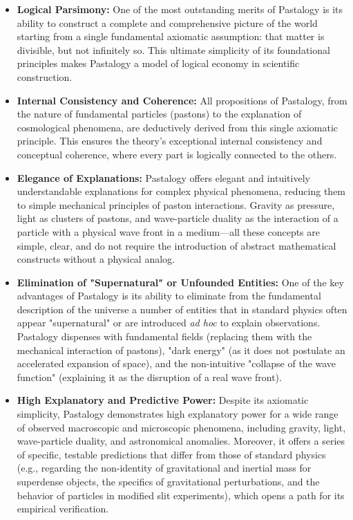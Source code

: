 \documentclass[pdflatex,sn-mathphys-num]{sn-jnl}
\begin{document}
\begin{itemize}
    \item \textbf{Logical Parsimony:} One of the most outstanding merits of Pastalogy is its ability to construct a complete and comprehensive picture of the world starting from a single fundamental axiomatic assumption: that matter is divisible, but not infinitely so. This ultimate simplicity of its foundational principles makes Pastalogy a model of logical economy in scientific construction.
    
    \item \textbf{Internal Consistency and Coherence:} All propositions of Pastalogy, from the nature of fundamental particles (pastons) to the explanation of cosmological phenomena, are deductively derived from this single axiomatic principle. This ensures the theory's exceptional internal consistency and conceptual coherence, where every part is logically connected to the others.
    
    \item \textbf{Elegance of Explanations:} Pastalogy offers elegant and intuitively understandable explanations for complex physical phenomena, reducing them to simple mechanical principles of paston interactions. Gravity as pressure, light as clusters of pastons, and wave-particle duality as the interaction of a particle with a physical wave front in a medium---all these concepts are simple, clear, and do not require the introduction of abstract mathematical constructs without a physical analog.
    
    \item \textbf{Elimination of "Supernatural" or Unfounded Entities:} One of the key advantages of Pastalogy is its ability to eliminate from the fundamental description of the universe a number of entities that in standard physics often appear "supernatural" or are introduced \textit{ad hoc} to explain observations. Pastalogy dispenses with fundamental fields (replacing them with the mechanical interaction of pastons), "dark energy" (as it does not postulate an accelerated expansion of space), and the non-intuitive "collapse of the wave function" (explaining it as the disruption of a real wave front).
    
    \item \textbf{High Explanatory and Predictive Power:} Despite its axiomatic simplicity, Pastalogy demonstrates high explanatory power for a wide range of observed macroscopic and microscopic phenomena, including gravity, light, wave-particle duality, and astronomical anomalies. Moreover, it offers a series of specific, testable predictions that differ from those of standard physics (e.g., regarding the non-identity of gravitational and inertial mass for superdense objects, the specifics of gravitational perturbations, and the behavior of particles in modified slit experiments), which opens a path for its empirical verification.
\end{itemize}
\end{document}
